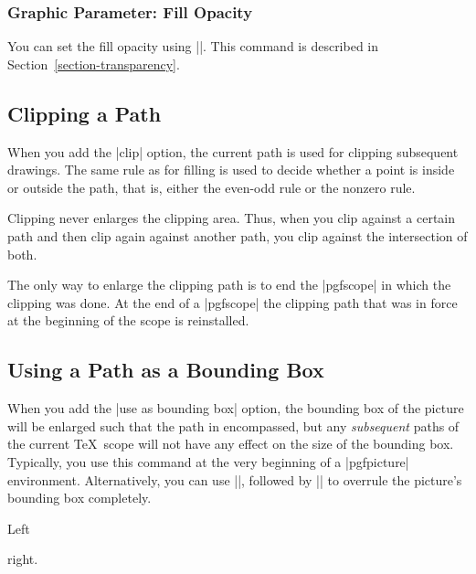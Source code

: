 \subsubsection{Graphic Parameter: Fill Opacity}

You can set the fill opacity using |\pgfsetfillopacity|. This command is
described in Section~\ref{section-transparency}.


\subsection{Clipping a Path}
\label{section-clip}

When you add the |clip| option, the current path is used for clipping
subsequent drawings. The same rule as for filling is used to decide whether a
point is inside or outside the path, that is, either the even-odd rule or the
nonzero rule.

Clipping never enlarges the clipping area. Thus, when you clip against a
certain path and then clip again against another path, you clip against the
intersection of both.

The only way to enlarge the clipping path is to end the |{pgfscope}| in which
the clipping was done. At the end of a |{pgfscope}| the clipping path that was
in force at the beginning of the scope is reinstalled.


\subsection{Using a Path as a Bounding Box}
\label{section-using-bb}

When you add the |use as bounding box| option, the bounding box of the picture
will be enlarged such that the path in encompassed, but any \emph{subsequent}
paths of the current \TeX\ scope will not have any effect on the size of the
bounding box. Typically, you use this command at the very beginning of a
|{pgfpicture}| environment. Alternatively, you can use |\pgfresetboundingbox|,
followed by || to overrule the picture's
bounding box completely.
%
\begin{codeexample}[]
Left
\begin{pgfpicture}
  \pgfpathrectangle{\pgfpointorigin}{\pgfpoint{2ex}{1ex}}

  \pgfpathcircle{\pgfpointorigin}{2ex}
\end{pgfpicture}
right.
\end{codeexample}
